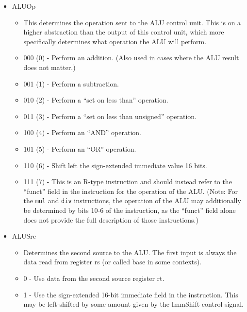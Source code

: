 \documentclass[
    paper=letter,
    parskip=half,
    fontsize=12pt,
    titlepage=firstiscover,
    toc=bibliography,
    numbers=endperiod
]{scrartcl}
\providecommand{\tightlist}{%
  \setlength{\itemsep}{0pt}\setlength{\parskip}{0pt}}
\begin{document}
\begin{itemize}
    \item ALUOp
          \begin{itemize}
              \tightlist
              \item This determines the operation sent to the ALU control unit. This is on a
                    higher abstraction than the output of this control unit, which more
                    specifically determines what operation the ALU will perform.
              \item 000 (0) - Perform an addition. (Also used in cases where the ALU result does not matter.)
              \item 001 (1) - Perform a subtraction.
              \item 010 (2) - Perform a ``set on less than'' operation.
              \item 011 (3) - Perform a ``set on less than unsigned'' operation.
              \item 100 (4) - Perform an ``AND'' operation.
              \item 101 (5) - Perform an ``OR'' operation.
              \item 110 (6) - Shift left the sign-extended immediate value 16 bits.
              \item 111 (7) - This is an R-type instruction and should instead
                    refer to the ``funct'' field in the instruction for the
                    operation of the ALU. (Note: For the \texttt{mul} and
                    \texttt{div} instructions, the operation of the ALU may
                    additionally be determined by bits 10-6 of the instruction, as
                    the ``funct'' field alone does not provide the full description
                    of those instructions.)
          \end{itemize}

    \item ALUSrc
          \begin{itemize}
              \tightlist
              \item Determines the second source to the ALU. The first input is always the
                    data read from register rs (or called base in some contexts).
              \item 0 - Use data from the second source register rt.
              \item 1 - Use the sign-extended 16-bit immediate field in the instruction.
                    This may be left-shifted by some amount given by the ImmShift control signal.
          \end{itemize}


\end{itemize}
\end{document}
